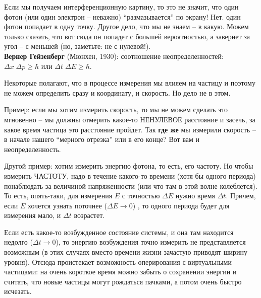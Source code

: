Если мы получаем интерференционную картину, то это не значит, что один фотон (или один электрон -- неважно) ``размазывается'' по экрану! Нет. один фотон попадает в одну точку. Другое дело, что мы не знаем -- в какую. Можем только сказать, что вот сюда он попадет с большей вероятностью, а завернет за угол -- с меньшей (но, заметьте: не с нулевой!).\\[5mm]

{\bf Вернер Гейзенберг} (Мюнхен, 1930): соотношение неопределенностей: $\Delta x\;\Delta p\geq \hbar$ или $\Delta t\;\Delta E\geq \hbar$.

Некоторые полагают, что в процессе измерения мы влияем на частицу и поэтому не можем определить сразу и координату, и скорость. Но дело не в этом.

Пример: если мы хотим измерить скорость, то мы не можем сделать это мгновенно -- мы должны отмерить какое-то НЕНУЛЕВОЕ расстояние и засечь, за какое время частица это расстояние пройдет. Так {\bf где же} мы измерили скорость -- в начале нашего ``мерного отрезка'' или в его конце? Вот вам и неопределенность.

Другой пример: хотим измерить энергию фотона, то есть, его частоту. Но чтобы измерить ЧАСТОТУ, надо в течение какого-то времени (хотя бы одного периода) понаблюдать за величиной напряженности (или что там в этой волне колеблется). То есть, опять-таки, для измерения $E$ с точностью $\Delta E$ нужно время $\Delta t$. Причем, если $E$ хочется узнать поточнее ($\Delta E\rightarrow0$) , то одного периода будет для измерения мало, и $\Delta t$ возрастет.

Если есть какое-то возбужденное состояние системы, и она там находится недолго  ($\Delta t\rightarrow0$), то энергию возбуждения точно измерить не представляется возможным (в этих случаях вместо времени жизни зачастую приводят ширину уровня). Отсюда проистекает возможность оперирования с виртуальными частицами: на очень короткое время можно забыть о сохранении энергии и считать, что новые частицы могут рождаться пачками, а потом очень быстро исчезать.\\[5mm]

